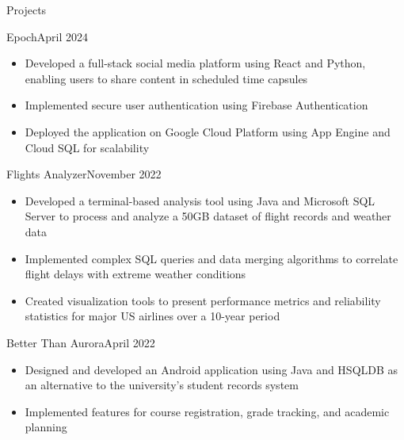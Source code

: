 \documentclass{article}
\newlength{\tabin}
\newlength{\secsep}
\newcommand{\lineunder}{\vspace*{-8pt} \\ \hspace*{-6pt} \hrulefill \\ \vspace*{-15pt}}
\newenvironment{tabbedsection}[1]{
    \begin{list}{}{
        \setlength{\itemsep}{0pt}
        \setlength{\labelsep}{0pt}
        \setlength{\labelwidth}{0pt}
        \setlength{\leftmargin}{\tabin}
        \setlength{\rightmargin}{\tabin}
        \setlength{\listparindent}{0pt}
        \setlength{\parsep}{0pt}
        \setlength{\parskip}{0pt}
        \setlength{\partopsep}{0pt}
        \setlength{\topsep}{#1}
    }
        \item[]
        }{
    \end{list}}
\newenvironment{resume_section}[1]{
    \vspace{2\secsep}
    \textsc{\large#1}
    \lineunder
    \begin{tabbedsection}{\secsep}
    }{\end{tabbedsection}}
\newenvironment{resume_subsection}[2]{
    \begin{minipage}[t]{0.75\linewidth}
        \textbf{#1}
    \end{minipage}%
    \begin{minipage}[t]{0.25\linewidth}
        \hfill \footnotesize #2
    \end{minipage}
    \begin{tabbedsection}{0.5\secsep}
    }{\end{tabbedsection}}
\newenvironment{subitems}{
    \renewcommand{\labelitemi}{-}
    \begin{itemize}
        \setlength{\labelsep}{1em}
        }{
    \end{itemize}}
\begin{document}
\begin{resume_section}{Projects}
        \begin{resume_subsection}{Epoch}{April 2024}
            \begin{subitems}
                \item Developed a full-stack social media platform using React and Python, enabling users to share content in scheduled time capsules
                \item Implemented secure user authentication using Firebase Authentication
                \item Deployed the application on Google Cloud Platform using App Engine and Cloud SQL for scalability
            \end{subitems}
        \end{resume_subsection}

        \begin{resume_subsection}{Flights Analyzer}{November 2022}
            \begin{subitems}
                \item Developed a terminal-based analysis tool using Java and Microsoft SQL Server to process and analyze a 50GB dataset of flight records and weather data
                \item Implemented complex SQL queries and data merging algorithms to correlate flight delays with extreme weather conditions
                \item Created visualization tools to present performance metrics and reliability statistics for major US airlines over a 10-year period
            \end{subitems}
        \end{resume_subsection}

        \begin{resume_subsection}{Better Than Aurora}{April 2022}
            \begin{subitems}
                \item Designed and developed an Android application using Java and HSQLDB as an alternative to the university's student records system
                \item Implemented features for course registration, grade tracking, and academic planning
            \end{subitems}
        \end{resume_subsection}
    \end{resume_section}
\end{document}
